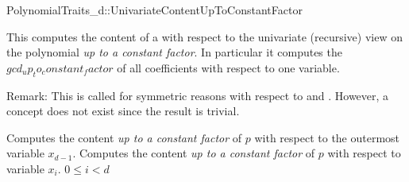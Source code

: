 \begin{ccRefConcept}{PolynomialTraits_d::UnivariateContentUpToConstantFactor}

\ccDefinition

This  computes the content of a 
with respect to the univariate (recursive) view on the 
polynomial {\em up to  a constant factor}. 
In particular it computes the $gcd_up_to_constant_factor$ of all 
coefficients  with respect to one variable. 

Remark: This is called  for 
symmetric reasons with respect to  
and . 
However, a concept  does not exist
since the result is trivial. 
 
\ccRefines 
{}

\ccTypes

\ccGlue
{}\ccGlue
{}

\ccOperations
{}
         {Computes the content {\em up to  a constant factor} of $p$ with 
          respect to the outermost variable $x_{d-1}$. }
         {Computes the content {\em up to  a constant factor} of $p$ with 
          respect to variable $x_i$. 
          \ccPrecond $0 \leq i  < d$
         }


\ccSeeAlso

\\
\\

\end{ccRefConcept}

